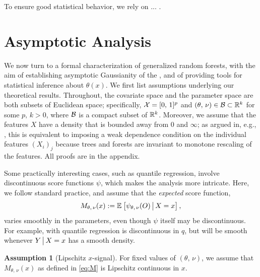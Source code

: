\documentclass[aos]{imsart}
\theoremstyle{plain}
\theoremstyle{definition}
\newtheorem{assu}{Assumption}
\theoremstyle{remark}
\begin{document}
\begin{CJK}{UTF8}{gbsn}
To ensure good statistical behavior,
we rely on ... .


\section{Asymptotic Analysis}
\label{sec:theory}


We now turn to a formal characterization of generalized random forests, with the aim of
establishing asymptotic Gaussianity of the , and of providing
tools for statistical inference about $\theta(x)$.
We first list assumptions underlying our theoretical results.
Throughout, the covariate space and the parameter space are both subsets of Euclidean space;
specifically, $\mathcal{X} = [0, \, 1]^p$ and $(\theta, \, \nu) \in \mathcal{B} \subset \mathbb{R}^k$
for some $p, \, k > 0$, where $\mathcal{B}$ is a compact subset of $\mathbb{R}^k$.
Moreover, we assume that the features $X$ have a density that is bounded away from 0 and $\infty$; as
argued in, e.g., \citet{wager2015uniform}, this is equivalent to imposing a weak dependence condition on the
individual features $(X_i)_j$ because trees and forests are invariant to monotone rescaling of the features.
All proofs are in the appendix.

Some practically interesting cases, such as quantile regression, involve discontinuous score functions $\psi$,
which makes the analysis more intricate. Here, we follow standard practice, and
assume that the \emph{expected} score function,
\begin{equation}
\label{eq:M}
M_{\theta, \, \nu}(x) := \EE{\psi_{\theta, \, \nu}(O) \cond X = x},
\end{equation}
varies smoothly in the parameters, even though $\psi$ itself may be
discontinuous. For example, with quantile regression
 is discontinuous in $q$,
but  will be smooth
whenever $Y\,\big|\, X = x$ has a smooth density.

\begin{assu}[Lipschitz $x$-signal]
\label{assu:lip}
For fixed values of $(\theta, \, \nu)$, we assume that $M_{\theta, \, \nu}(x)$ 
as defined in \eqref{eq:M} is Lipschitz continuous in $x$.
\end{assu}


\end{CJK}
\end{document}
